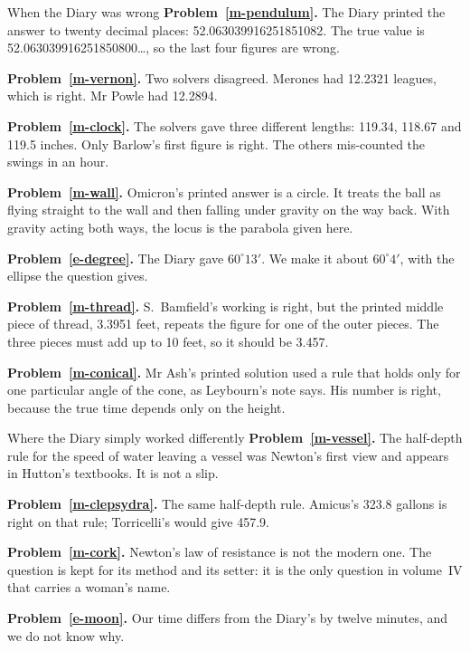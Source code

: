 \documentclass[11pt,a4paper]{article}
\begin{document}
\begin{diarynote}{When the Diary was wrong}
\textbf{Problem~\ref{m-pendulum}.} The Diary printed the answer to twenty decimal places:
52.063039916251851082. The true value is 52.063039916251850800\dots, so the last four
figures are wrong.

\textbf{Problem~\ref{m-vernon}.} Two solvers disagreed. Merones had 12.2321 leagues, which
is right. Mr Powle had 12.2894.

\textbf{Problem~\ref{m-clock}.} The solvers gave three different lengths: 119.34, 118.67 and
119.5 inches. Only Barlow's first figure is right. The others mis-counted the swings in an
hour.

\textbf{Problem~\ref{m-wall}.} Omicron's printed answer is a circle. It treats the ball as
flying straight to the wall and then falling under gravity on the way back. With gravity
acting both ways, the locus is the parabola given here.

\textbf{Problem~\ref{e-degree}.} The Diary gave $60^\circ13'$. We make it about $60^\circ4'$,
with the ellipse the question gives.

\textbf{Problem~\ref{m-thread}.} S.~Bamfield's working is right, but the printed middle piece
of thread, 3.3951 feet, repeats the figure for one of the outer pieces. The three pieces
must add up to 10 feet, so it should be 3.457.

\textbf{Problem~\ref{m-conical}.} Mr Ash's printed solution used a rule that holds only for
one particular angle of the cone, as Leybourn's note says. His number is right, because
the true time depends only on the height.
\end{diarynote}

\begin{diarynote}{Where the Diary simply worked differently}
\textbf{Problem~\ref{m-vessel}.} The half-depth rule for the speed of water leaving a vessel
was Newton's first view and appears in Hutton's textbooks. It is not a slip.

\textbf{Problem~\ref{m-clepsydra}.} The same half-depth rule. Amicus's 323.8 gallons is
right on that rule; Torricelli's would give 457.9.

\textbf{Problem~\ref{m-cork}.} Newton's law of resistance is not the modern one. The
question is kept for its method and its setter: it is the only question in volume~IV
that carries a woman's name.

\textbf{Problem~\ref{e-moon}.} Our time differs from the Diary's by twelve minutes, and we
do not know why.
\end{diarynote}
\end{document}
